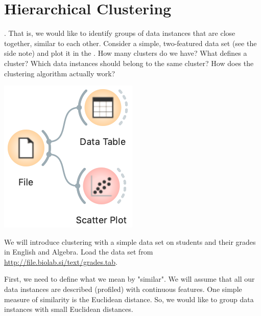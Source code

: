 \chapter{Hierarchical Clustering}
\label{ch:hierarchical_clustering}

. That is, we would like to identify groups of data instances that are close together, similar to each other. Consider a simple, two-featured data set (see the side note) and plot it in the . How many clusters do we have? What defines a cluster? Which data instances should belong to the same cluster? How does the clustering algorithm actually work?

\begin{marginfigure}
    \includegraphics[scale=0.4]{workflow_scatterplot.png}
    \caption{We will introduce clustering with a simple data set on students and their grades in English and Algebra.
Load the data set from \url{http://file.biolab.si/text/grades.tab}.}
\end{marginfigure}

First, we need to define what we mean by "similar". We will assume that all our data instances are described (profiled) with continuous features. One simple measure of similarity is the Euclidean distance. So, we would like to group data instances with small Euclidean distances.

